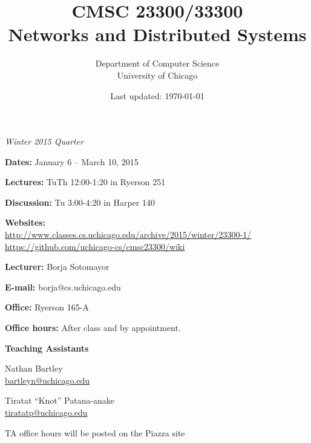 \documentclass[11pt]{article}
\title{CMSC 23300/33300\\Networks and Distributed Systems}
\author{Department of Computer Science\\University of Chicago}
\date{Last updated: \today}
\begin{document}
\maketitle
\thispagestyle{empty}

\begin{center}
\begin{minipage}{0.6\textwidth}
\begin{center}
\emph{Winter 2015 Quarter}
\end{center}
\textbf{Dates:} January 6 -- March 10, 2015

\textbf{Lectures:} TuTh 12:00-1:20 in Ryerson 251

\textbf{Discussion:} Tu 3:00-4:20 in Harper 140

\textbf{Websites:}\\
 \url{http://www.classes.cs.uchicago.edu/archive/2015/winter/23300-1/}\\
 \url{https://github.com/uchicago-cs/cmsc23300/wiki}
\
\vspace{1em}

\textbf{Lecturer:} Borja Sotomayor

\textbf{E-mail:} borja@cs.uchicago.edu

\textbf{Office:} Ryerson 165-A

\textbf{Office hours:} After class and by appointment.

\end{minipage}

\vspace{2ex}
\textbf{Teaching Assistants}
\vspace{1ex}

\begin{minipage}[t]{0.35\textwidth}
\begin{center}
Nathan Bartley\\\url{bartleyn@uchicago.edu}
\end{center}
\end{minipage}
\hspace{1ex}
\begin{minipage}[t]{0.35\textwidth}
\begin{center}
Tiratat ``Knot'' Patana-anake\\\url{tiratatp@uchicago.edu}
\end{center}
\end{minipage}

\vspace{1ex}

TA office hours will be posted on the Piazza site

\end{center}
\end{document}
